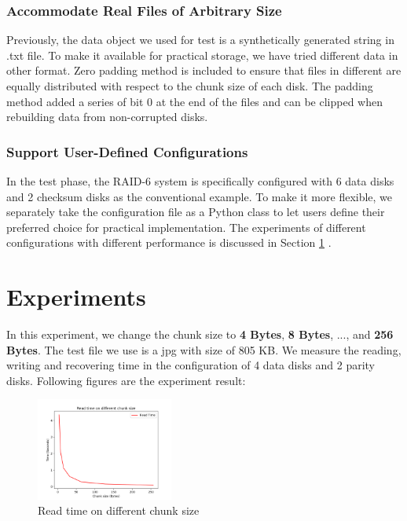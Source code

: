 \documentclass[journal]{IEEEtran}
\begin{document}
\subsubsection{Accommodate Real Files of Arbitrary Size} Previously, the data object we used for test is a synthetically generated string in .txt file. To make it available for practical storage, we have tried different data in other format. Zero padding method is included to ensure that files in different are equally distributed with respect to the chunk size of each disk. The padding  method added a series of bit 0 at the end of the files and can be clipped when rebuilding data from non-corrupted disks.

\subsubsection{Support User-Defined Configurations } In the test phase, the RAID-6 system is specifically configured with 6 data disks and 2 checksum disks as the conventional example.  To make it more flexible, we separately take the configuration file as a Python class to let users define their preferred choice for practical implementation. The experiments of different configurations with different performance is discussed in Section \ref{sec5} . 

\section{Experiments}

\label{sec5}

In this experiment, we change the chunk size to \textbf{4 Bytes}, \textbf{8 Bytes}, ..., and \textbf{256 Bytes}. The test file we use is a jpg with size of 805 KB. We measure the reading, writing and recovering time in the configuration of 4 data disks and 2 parity disks. Following figures are the experiment result:


\begin{figure}[htbp]

	\centering

	\captionsetup{justification=centering}

	\includegraphics[width=0.4\textwidth]{fig/result_read.png}

	\caption{Read time on different chunk size}

\end{figure}
\end{document}
